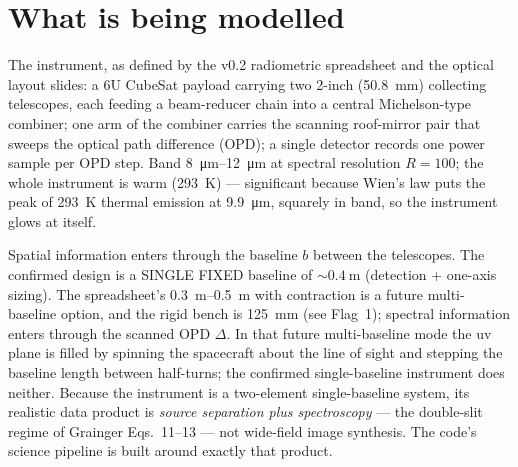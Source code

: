 \documentclass[11pt]{article}
\begin{document}
\section{What is being modelled}

The instrument, as defined by the v0.2 radiometric spreadsheet and the
optical layout slides: a 6U CubeSat payload carrying two 2-inch
(\SI{50.8}{\milli\metre}) collecting telescopes, each feeding a beam-reducer
chain into a central Michelson-type combiner; one arm of the combiner carries
the scanning roof-mirror pair that sweeps the optical path difference (OPD);
a single detector records one power sample per OPD step. Band
\SIrange{8}{12}{\micro\metre} at spectral resolution $R=100$; the whole
instrument is warm (\SI{293}{\kelvin}) --- significant because Wien's law puts
the peak of \SI{293}{\kelvin} thermal emission at \SI{9.9}{\micro\metre},
squarely in band, so the instrument glows at itself.

Spatial information enters through the baseline $b$ between the telescopes.
The confirmed design is a SINGLE FIXED baseline of ${\sim}\SI{0.4}{\metre}$
(detection + one-axis sizing). The spreadsheet's \SIrange{0.3}{0.5}{\metre}
with contraction is a future multi-baseline option, and the rigid bench is
\SI{125}{\milli\metre} (see Flag~1); spectral information enters through the
scanned OPD $\Delta$. In that future multi-baseline mode the uv plane is
filled by spinning the spacecraft about the line of sight and stepping the
baseline length between half-turns; the confirmed single-baseline instrument
does neither. Because the
instrument is a two-element single-baseline system, its realistic data product
is \emph{source separation plus spectroscopy} --- the double-slit regime of
Grainger Eqs.~11--13 --- not wide-field image synthesis. The code's science
pipeline is built around exactly that product.
\end{document}
